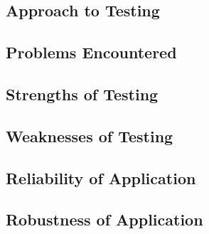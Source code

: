 \subsection{Approach to Testing}

\subsection{Problems Encountered}

\subsection{Strengths of Testing}

\subsection{Weaknesses of Testing}

\subsection{Reliability of Application}

\subsection{Robustness of Application}